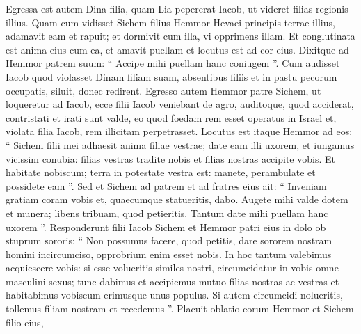\begin{biblechapter}
\begin{biblechapter}
\begin{biblechapter}
\begin{biblechapter}
\begin{biblechapter}
\begin{biblechapter}
\begin{biblechapter}
\begin{biblechapter}
\begin{biblechapter}
\begin{biblechapter}
\begin{biblechapter}
\begin{biblechapter}
\begin{biblechapter}
\begin{biblechapter}
\begin{biblechapter}
\begin{biblechapter}
\begin{biblechapter}
\begin{biblechapter}
\begin{biblechapter}
\begin{biblechapter}
\begin{biblechapter}
\begin{biblechapter}
\begin{biblechapter}
\begin{biblechapter}
\begin{biblechapter}
\begin{biblechapter}
\begin{biblechapter}
\begin{biblechapter}
\begin{biblechapter}
\begin{biblechapter}
\begin{biblechapter}
\begin{biblechapter}
\begin{biblechapter}
\begin{biblechapter}
\verse Egressa est autem Dina filia, quam Lia pepererat Iacob, ut videret filias regionis illius. 
\verse Quam cum vidisset Sichem filius Hemmor Hevaei principis terrae illius, adamavit eam et rapuit; et dormivit cum illa, vi opprimens illam. 
 \verse Et conglutinata est anima eius cum ea, et amavit puellam et locutus est ad cor eius. 
\verse Dixitque ad Hemmor patrem suum: “ Accipe mihi puellam hanc coniugem ”. 
\verse Cum audisset Iacob quod violasset Dinam filiam suam, absentibus filiis et in pastu pecorum occupatis, siluit, donec redirent.
 \verse Egresso autem Hemmor patre Sichem, ut loqueretur ad Iacob, 
\verse ecce filii Iacob veniebant de agro, auditoque, quod acciderat, contristati et irati sunt valde, eo quod foedam rem esset operatus in Israel et, violata filia Iacob, rem illicitam perpetrasset.
 \verse Locutus est itaque Hemmor ad eos: “ Sichem filii mei adhaesit anima filiae vestrae; date eam illi uxorem, 
\verse et iungamus vicissim conubia: filias vestras tradite nobis et filias nostras accipite vobis. 
\verse Et habitate nobiscum; terra in potestate vestra est: manete, perambulate et possidete eam ”. 
 \verse Sed et Sichem ad patrem et ad fratres eius ait: “ Inveniam gratiam coram vobis et, quaecumque statueritis, dabo. 
\verse Augete mihi valde dotem et munera; libens tribuam, quod petieritis. Tantum date mihi puellam hanc uxorem ”.
 \verse Responderunt filii Iacob Sichem et Hemmor patri eius in dolo ob stuprum sororis: 
\verse “ Non possumus facere, quod petitis, dare sororem nostram homini incircumciso, opprobrium enim esset nobis. 
\verse In hoc tantum valebimus acquiescere vobis: si esse volueritis similes nostri, circumcidatur in vobis omne masculini sexus; 
\verse tunc dabimus et accipiemus mutuo filias nostras ac vestras et habitabimus vobiscum erimusque unus populus. 
\verse Si autem circumcidi nolueritis, tollemus filiam nostram et recedemus ”.
 \verse Placuit oblatio eorum Hemmor et Sichem filio eius, 

\end{biblechapter}
\end{biblechapter}
\end{biblechapter}
\end{biblechapter}
\end{biblechapter}
\end{biblechapter}
\end{biblechapter}
\end{biblechapter}
\end{biblechapter}
\end{biblechapter}
\end{biblechapter}
\end{biblechapter}
\end{biblechapter}
\end{biblechapter}
\end{biblechapter}
\end{biblechapter}
\end{biblechapter}
\end{biblechapter}
\end{biblechapter}
\end{biblechapter}
\end{biblechapter}
\end{biblechapter}
\end{biblechapter}
\end{biblechapter}
\end{biblechapter}
\end{biblechapter}
\end{biblechapter}
\end{biblechapter}
\end{biblechapter}
\end{biblechapter}
\end{biblechapter}
\end{biblechapter}
\end{biblechapter}
\end{biblechapter}
